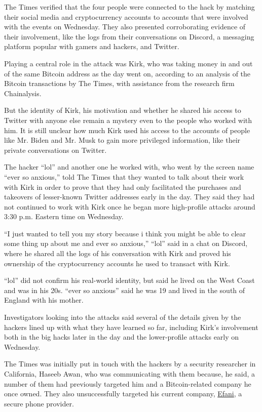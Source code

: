 The Times verified that the four people were connected to the hack by
matching their social media and cryptocurrency accounts to accounts that
were involved with the events on Wednesday. They also presented
corroborating evidence of their involvement, like the logs from their
conversations on Discord, a messaging platform popular with gamers and
hackers, and Twitter.

Playing a central role in the attack was Kirk, who was taking money in
and out of the same Bitcoin address as the day went on, according to an
analysis of the Bitcoin transactions by The Times, with assistance from
the research firm Chainalysis.

But the identity of Kirk, his motivation and whether he shared his
access to Twitter with anyone else remain a mystery even to the people
who worked with him. It is still unclear how much Kirk used his access
to the accounts of people like Mr. Biden and Mr. Musk to gain more
privileged information, like their private conversations on Twitter.

The hacker ``lol'' and another one he worked with, who went by the
screen name ``ever so anxious,'' told The Times that they wanted to talk
about their work with Kirk in order to prove that they had only
facilitated the purchases and takeovers of lesser-known Twitter
addresses early in the day. They said they had not continued to work
with Kirk once he began more high-profile attacks around 3:30 p.m.
Eastern time on Wednesday.

``I just wanted to tell you my story because i think you might be able
to clear some thing up about me and ever so anxious,'' ``lol'' said in a
chat on Discord, where he shared all the logs of his conversation with
Kirk and proved his ownership of the cryptocurrency accounts he used to
transact with Kirk.

``lol'' did not confirm his real-world identity, but said he lived on
the West Coast and was in his 20s. ``ever so anxious'' said he was 19
and lived in the south of England with his mother.

Investigators looking into the attacks said several of the details given
by the hackers lined up with what they have learned so far, including
Kirk's involvement both in the big hacks later in the day and the
lower-profile attacks early on Wednesday.

The Times was initially put in touch with the hackers by a security
researcher in California, Haseeb Awan, who was communicating with them
because, he said, a number of them had previously targeted him and a
Bitcoin-related company he once owned. They also unsuccessfully targeted
his current company, \href{https://www.efani.com/}{Efani}, a secure
phone provider.

